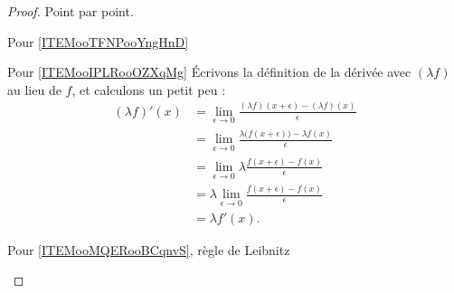\begin{proof}
    Point par point.
    \begin{subproof}
        \item[Pour \ref{ITEMooTFNPooYngHnD}]
        \item[Pour \ref{ITEMooIPLRooOZXqMg}]
            Écrivons la définition de la dérivée avec $(\lambda f)$ au lieu de $f$, et calculons un petit peu :
            \begin{subequations}
                \begin{align}
                    (\lambda f)'(x) &=\lim_{\epsilon\to 0}\frac{ (\lambda f)(x+\epsilon)-(\lambda f)(x) }{ \epsilon }\\
                            &=\lim_{\epsilon\to 0}\frac{ \lambda \big( f(x+\epsilon) \big)-\lambda f(x) }{ \epsilon }\\
                            &=\lim_{\epsilon\to 0}\lambda \frac{ f(x+\epsilon) -f(x) }{ \epsilon }\\
                            &=\lambda \lim_{\epsilon\to 0}\frac{ f(x+\epsilon) -f(x) }{ \epsilon }\\
                            &=\lambda f'(x).
                \end{align}
            \end{subequations}
        \item[Pour \ref{ITEMooMQERooBCqnvS}, règle de Leibnitz]


\end{subproof}
\end{proof}
